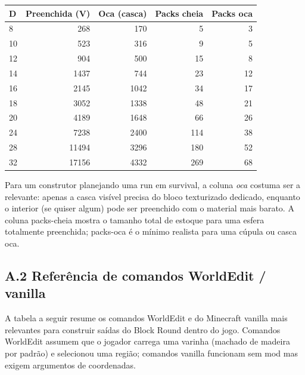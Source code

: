 \documentclass[12pt,a4paper]{scrartcl}
\begin{document}
\vspace{0.4em}
\begin{center}
\begin{tabular}{@{}lrrrr@{}}
\toprule
\textbf{D} & \textbf{Preenchida (V)} & \textbf{Oca (casca)} & \textbf{Packs cheia} & \textbf{Packs oca} \\
\midrule
8   &   268 &   170 &  5  &  3  \\
10  &   523 &   316 &  9  &  5  \\
12  &   904 &   500 & 15  &  8  \\
14  &  1437 &   744 & 23  & 12  \\
16  &  2145 &  1042 & 34  & 17  \\
18  &  3052 &  1338 & 48  & 21  \\
20  &  4189 &  1648 & 66  & 26  \\
24  &  7238 &  2400 & 114 & 38  \\
28  & 11494 &  3296 & 180 & 52  \\
32  & 17156 &  4332 & 269 & 68  \\
\bottomrule
\end{tabular}
\end{center}

Para um construtor planejando uma run em survival, a coluna \emph{oca} costuma ser a relevante: apenas a casca visível precisa do bloco texturizado dedicado, enquanto o interior (se quiser algum) pode ser preenchido com o material mais barato. A coluna packs-cheia mostra o tamanho total de estoque para uma esfera totalmente preenchida; packs-oca é o mínimo realista para uma cúpula ou casca oca.

\subsection*{A.2 Referência de comandos WorldEdit / vanilla}
A tabela a seguir resume os comandos WorldEdit e do Minecraft vanilla mais relevantes para construir saídas do Block Round dentro do jogo. Comandos WorldEdit assumem que o jogador carrega uma varinha (machado de madeira por padrão) e selecionou uma região; comandos vanilla funcionam sem mod mas exigem argumentos de coordenadas.
\end{document}
